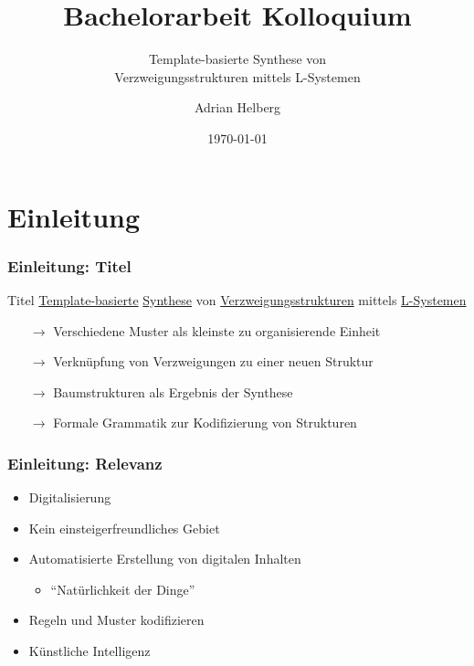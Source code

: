 \documentclass[12pt]{beamer}
\subtitle{Template-basierte Synthese von\\Verzweigungsstrukturen mittels L-Systemen}
\title{Bachelorarbeit Kolloquium}
\author{Adrian Helberg}
\institute{HAW Hamburg}
\date{\today}
\begin{document}
    \frame{\titlepage}

    \section{Einleitung}
    \label{sec:thema}
    \begin{frame}[allowframebreaks]
        \frametitle{Einleitung: Titel}

        \begin{block}{Titel}
            \color{olive}\underline{\color{black}Template-basierte} \color{teal}\underline{\color{black}Synthese} 
            \color{black}von \color{orange}\underline{\color{black}Verzweigungsstrukturen} \color{black}mittels 
            \color{cyan}\underline{\color{black}L-Systemen}
        \end{block}

        \begin{itemize}
            \item[\color{olive}$\rightarrow$] \color{black}Verschiedene Muster als kleinste zu organisierende Einheit
            \item[\color{teal}$\rightarrow$] \color{black}Verknüpfung von Verzweigungen zu einer neuen Struktur
            \item[\color{orange}$\rightarrow$] \color{black}Baumstrukturen als Ergebnis der Synthese
            \item[\color{cyan}$\rightarrow$] \color{black}Formale Grammatik zur Kodifizierung von Strukturen
        \end{itemize}
    \end{frame}

    \begin{frame}
        \frametitle{Einleitung: Relevanz}

        \begin{itemize}
            \setlength\itemsep{1em}
            \item Digitalisierung
            \item Kein einsteigerfreundliches Gebiet
            \item Automatisierte Erstellung von digitalen Inhalten
            \begin{itemize}
                \item "`Natürlichkeit der Dinge"'
            \end{itemize}
            \item Regeln und Muster kodifizieren
            \item Künstliche Intelligenz
        \end{itemize}
    \end{frame}
\end{document}
